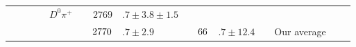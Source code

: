 \begin{adjustbox}{width=0.76\textwidth,center}
{\begin{tabular}{cp{5pt}cp{5pt}cp{5pt}r@{}lp{5pt}r@{}lp{5pt}cp{5pt}c}
		                                         &                  &                              &                  & $D^{0}\pi^{+}$                  &                       & $	2769$                       & $.7\pm3.8\pm1.5	$                             &                       & $		$                                             &                                              &                       & \babar{}                                                      &                       & \cite{delAmoSanchez:2010vq}               \\ \cmidrule{6-14}
		                                         &                  &                              &                  &                                 & \cellcolor{Gray}      & $	\cellcolor{Gray} 2770$      & \cellcolor{Gray}$.7 \pm 2.9	$                 & \cellcolor{Gray}      & $	\cellcolor{Gray} 66$                           & \cellcolor{Gray}$.7\pm12.4	$                 & \cellcolor{Gray}      & \cellcolor{Gray} Our average                                  & \cellcolor{Gray}      &                                           \\ \bottomrule
	\end{tabular}
}
\end{adjustbox}
